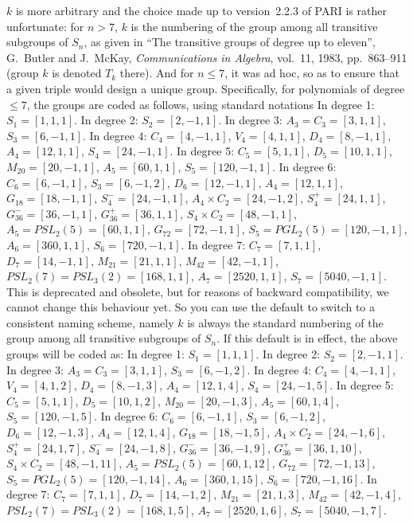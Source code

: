 $k$ is more arbitrary and the choice made up to version~2.2.3 of PARI is rather
unfortunate: for $n > 7$, $k$ is the numbering of the group among all
transitive subgroups of $S_n$, as given in ``The transitive groups of degree up
to eleven'', G.~Butler and J.~McKay, \emph{Communications in Algebra}, vol.~11,
1983,
pp.~863--911 (group $k$ is denoted $T_k$ there). And for $n \leq 7$, it was ad
hoc, so as to ensure that a given triple would design a unique group.
Specifically, for polynomials of degree $\leq 7$, the groups are coded as
follows, using standard notations
\smallskip
In degree 1: $S_1=[1,1,1]$.
\smallskip
In degree 2: $S_2=[2,-1,1]$.
\smallskip
In degree 3: $A_3=C_3=[3,1,1]$, $S_3=[6,-1,1]$.
\smallskip
In degree 4: $C_4=[4,-1,1]$, $V_4=[4,1,1]$, $D_4=[8,-1,1]$, $A_4=[12,1,1]$,
$S_4=[24,-1,1]$.
\smallskip
In degree 5: $C_5=[5,1,1]$, $D_5=[10,1,1]$, $M_{20}=[20,-1,1]$,
 $A_5=[60,1,1]$, $S_5=[120,-1,1]$.
\smallskip
In degree 6: $C_6=[6,-1,1]$, $S_3=[6,-1,2]$, $D_6=[12,-1,1]$, $A_4=[12,1,1]$,
$G_{18}=[18,-1,1]$, $S_4^-=[24,-1,1]$, $A_4\times C_2=[24,-1,2]$,
$S_4^+=[24,1,1]$, $G_{36}^-=[36,-1,1]$, $G_{36}^+=[36,1,1]$,
$S_4\times C_2=[48,-1,1]$, $A_5=PSL_2(5)=[60,1,1]$, $G_{72}=[72,-1,1]$,
$S_5=PGL_2(5)=[120,-1,1]$, $A_6=[360,1,1]$, $S_6=[720,-1,1]$.
\smallskip
In degree 7: $C_7=[7,1,1]$, $D_7=[14,-1,1]$, $M_{21}=[21,1,1]$,
$M_{42}=[42,-1,1]$, $PSL_2(7)=PSL_3(2)=[168,1,1]$, $A_7=[2520,1,1]$,
$S_7=[5040,-1,1]$.
\smallskip
This is deprecated and obsolete, but for reasons of backward compatibility,
we cannot change this behaviour yet. So you can use the default
 to switch to a consistent naming scheme, namely $k$ is
always the standard numbering of the group among all transitive subgroups of
$S_n$. If this default is in effect, the above groups will be coded as:
\smallskip
In degree 1: $S_1=[1,1,1]$.
\smallskip
In degree 2: $S_2=[2,-1,1]$.
\smallskip
In degree 3: $A_3=C_3=[3,1,1]$, $S_3=[6,-1,2]$.
\smallskip
In degree 4: $C_4=[4,-1,1]$, $V_4=[4,1,2]$, $D_4=[8,-1,3]$, $A_4=[12,1,4]$,
$S_4=[24,-1,5]$.
\smallskip
In degree 5: $C_5=[5,1,1]$, $D_5=[10,1,2]$, $M_{20}=[20,-1,3]$,
 $A_5=[60,1,4]$, $S_5=[120,-1,5]$.
\smallskip
In degree 6: $C_6=[6,-1,1]$, $S_3=[6,-1,2]$, $D_6=[12,-1,3]$, $A_4=[12,1,4]$,
$G_{18}=[18,-1,5]$, $A_4\times C_2=[24,-1,6]$, $S_4^+=[24,1,7]$,
$S_4^-=[24,-1,8]$, $G_{36}^-=[36,-1,9]$, $G_{36}^+=[36,1,10]$,
$S_4\times C_2=[48,-1,11]$, $A_5=PSL_2(5)=[60,1,12]$, $G_{72}=[72,-1,13]$,
$S_5=PGL_2(5)=[120,-1,14]$, $A_6=[360,1,15]$, $S_6=[720,-1,16]$.
\smallskip
In degree 7: $C_7=[7,1,1]$, $D_7=[14,-1,2]$, $M_{21}=[21,1,3]$,
$M_{42}=[42,-1,4]$, $PSL_2(7)=PSL_3(2)=[168,1,5]$, $A_7=[2520,1,6]$,
$S_7=[5040,-1,7]$.
\smallskip

